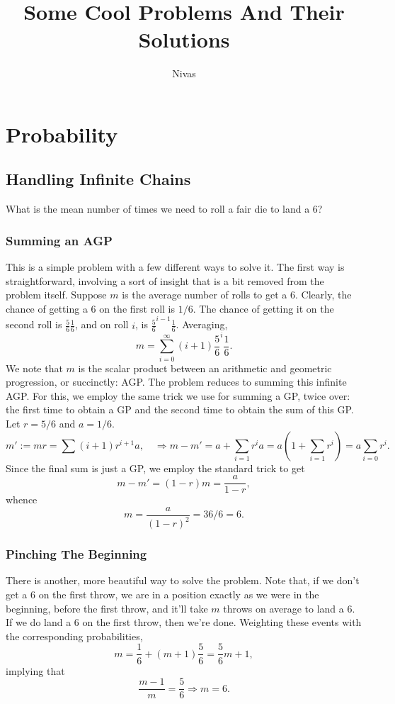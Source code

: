 \documentclass[reqno]{amsart}
\title{Some Cool Problems And Their Solutions}
\author{Nivas}
\begin{document}
\maketitle
\newpage
\section{Probability}
\subsection{Handling Infinite Chains}
What is the mean number of times we need to roll a fair die to land a 6?

\subsubsection{Summing an AGP}
This is a simple problem with a few different ways to solve it. The first way is straightforward, involving a sort of insight that is a bit removed from the problem itself. Suppose $m$ is the average number of rolls to get a 6. Clearly, the chance of getting a 6 on the first roll is $1/6$. The chance of getting it on the second roll is $\displaystyle \frac{5}{6} \frac{1}{6}$, and on roll $i$, is $\displaystyle \frac{5}{6}^{i-1} \frac{1}{6}$. Averaging, 
\[ m = \sum_{i=0} ^{\infty} (i+1) \frac{5}{6}^{i} \frac{1}{6}. \]
We note that $m$ is the scalar product between an arithmetic and geometric progression, or succinctly: AGP. The problem reduces to summing this infinite AGP. For this, we employ the same trick we use for summing a GP, twice over: the first time to obtain a GP and the second time to obtain the sum of this GP. Let $r = 5/6$ and $a = 1/6$.
\[  m' := m r = \sum (i+1) r^{i+1} a, \quad \Rightarrow m - m' = a + \sum_{i=1} r^i a = a \left( 1 + \sum_{i=1} r^i \right) = a \sum_{i = 0} r^i . \]
Since the final sum is just a GP, we employ the standard trick to get 
\[ m - m' = (1 - r)m = \frac{a}{1 - r},  \]
whence
\[ m = \frac{a}{(1 - r)^2} = 36/6 = 6. \]

\subsubsection{Pinching The Beginning}
There is another, more beautiful way to solve the problem. Note that, if we don't get a 6 on the first throw, we are in a position exactly as we were in the beginning, before the first throw, and it'll take $m$ throws on average to land a 6. If we do land a 6 on the first throw, then we're done. Weighting these events with the corresponding probabilities, 
\[ m = \frac{1}{6} + (m+1)\frac{5}{6} = \frac{5}{6}m + 1, \]
implying that
\[ \frac{m-1}{m} = \frac{5}{6} \Rightarrow m = 6.  \]
\end{document}
